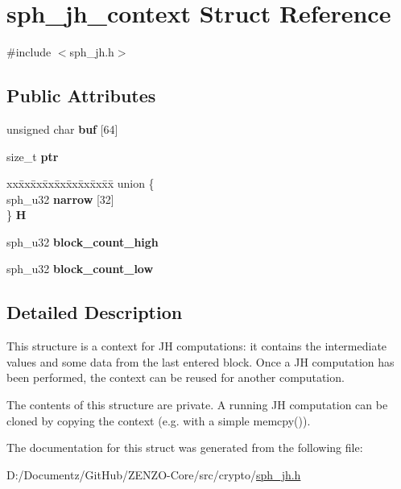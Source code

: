 \hypertarget{structsph__jh__context}{}\section{sph\+\_\+jh\+\_\+context Struct Reference}
\label{structsph__jh__context}


{\ttfamily \#include $<$sph\+\_\+jh.\+h$>$}

\subsection*{Public Attributes}
\begin{DoxyCompactItemize}
\item 
\mbox{\label{structsph__jh__context_a3dc7aa585cff408e168f5d0c5cc61400}} 
unsigned char {\bfseries buf} \mbox{[}64\mbox{]}
\item 
\mbox{\label{structsph__jh__context_aa6880d19dbdea6b710eb36447c4fc835}} 
size\+\_\+t {\bfseries ptr}
\item 
\mbox{\label{structsph__jh__context_aa994b5fb7ec509c80b5306bd4f12f311}} 
\begin{tabbing}
xx\=xx\=xx\=xx\=xx\=xx\=xx\=xx\=xx\=\kill
union \{\\
\>sph\_u32 {\bfseries narrow} \mbox{[}32\mbox{]}\\
\} {\bfseries H}\\

\end{tabbing}\item 
\mbox{\label{structsph__jh__context_a7ae4f4f5695c9d96ced8beeefe9e5114}} 
sph\+\_\+u32 {\bfseries block\+\_\+count\+\_\+high}
\item 
\mbox{\label{structsph__jh__context_a0aefbe622c0463e587bcd8fc257f8ecf}} 
sph\+\_\+u32 {\bfseries block\+\_\+count\+\_\+low}
\end{DoxyCompactItemize}


\subsection{Detailed Description}
This structure is a context for JH computations\+: it contains the intermediate values and some data from the last entered block. Once a JH computation has been performed, the context can be reused for another computation.

The contents of this structure are private. A running JH computation can be cloned by copying the context (e.\+g. with a simple {\ttfamily memcpy()}). 

The documentation for this struct was generated from the following file\+:\begin{DoxyCompactItemize}
\item 
D\+:/\+Documentz/\+Git\+Hub/\+Z\+E\+N\+Z\+O-\/\+Core/src/crypto/\mbox{\hyperlink{sph__jh_8h}{sph\+\_\+jh.\+h}}\end{DoxyCompactItemize}
